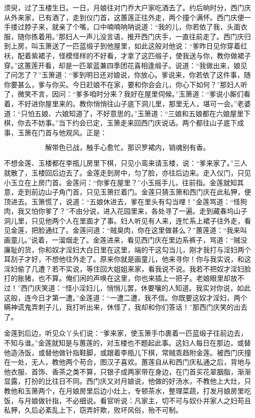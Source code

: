 须臾，过了玉楼生日。一日，月娘往对门乔大户家吃酒去了。约后晌时分，西门庆从外来家，已有酒了，走到仪门首，这蕙莲正往外走，两个撞个满怀。西门庆便一手搂过脖子来，就亲了个嘴，口中喃喃呐呐说道：“我的儿，你若依了我，头面衣服，随你拣着用。”那妇人一声儿没言语，推开西门庆手，一直往前走了。西门庆归到上房，叫玉箫送了一匹蓝缎子到他屋里，如此这般对他说：“爹昨日见你穿着红袄，配着紫裙子，怪模怪样的不好看，才拿了这匹缎子，使我送与你，教你做裙子穿。”这蕙莲开看，却是一匹翠蓝兼四季团花喜相逢缎子。说道：“我做出来，娘见了问怎了？”玉箫道：“爹到明日还对娘说，你放心。爹说来，你若依了这件事，随你要甚么，爹与你买。今日赶娘不在家，要和你会会儿，你心下如何？”那妇人听了，微笑不言，因问：“爹多咱时分来？我好在屋里伺候。”玉箫道：“爹说小厮们看着，不好进你屋里来的。教你悄悄往山子底下洞儿里，那里无人，堪可一会。”老婆道：“只怕五娘、六娘知道了，不好意思的。”玉箫道：“三娘和五娘都在六娘屋里下棋，你去不妨事。”当下约会已定，玉箫走来回西门庆说话。两个都往山子底下成事，玉箫在门首与他观风。正是：

\[
解带色已战，触手心愈忙。
那识罗裙内，销魂别有香。
\]

不想金莲、玉楼都在李瓶儿房里下棋，只见小鸾来请玉楼，说：“爹来家了。”三人就散了，玉楼回后边去了。金莲走到房中，匀了脸，亦往后边来。走入仪门，只见小玉立在上房门首。金莲问：“你爹在屋里？”小玉摇手儿，往前指。金莲就知其意，走到前边山子角门首，只见玉箫拦着门。金莲只猜玉箫和西门庆在此私狎，便顶进去。玉箫慌了，说道：“五娘休进去，爹在里头有勾当哩！”金莲骂道：“怪狗肉，我又怕你爹了？”不由分说，进入花园里来，各处寻了一遍。走到藏春坞山子洞儿里，只见他两个人在里面才了事。妇人听见有人来，连忙系上裙子往外走，看见金莲，把脸通红了。金莲问道：“贼臭肉，你在这里做甚么？”蕙莲道：“我来叫画童儿。”说着，一溜烟走了。金莲进来，看见西门庆在里边系裤子，骂道：“贼没廉耻的货，你和奴才淫妇大白日里在这里，端的干这勾当儿，刚才我打与淫妇两个耳刮子才好，不想他往外走了。原来你就是画童儿，他来寻你！你与我实说，和这淫妇偷了几遭？若不实说，等住回大姐姐来家，看我说不说。我若不把奴才淫妇脸打的胀猪，也不算。俺们闲的声唤在这里，你也来插上一把子。老娘眼里却放不过！”西门庆笑道：“怪小淫妇儿，悄悄儿罢，休要嚷的人知道。我实对你说，如此这般，连今日才第一遭。”金莲道：“一遭二遭，我不信。你既要这奴才淫妇，两个瞒神谎鬼弄刺子儿，我打听出来，休怪了，我却和你们答话！”那西门庆笑的出去了。

金莲到后边，听见众丫头们说：“爹来家，使玉箫手巾裹着一匹蓝缎子往前边去，不知与谁。”金莲就知是与蕙莲的，对玉楼也不题起此事。这妇人每日在那边，或替他造汤饭，或替他做针指鞋脚，或跟着李瓶儿下棋，常贼乖趋附金莲。被西门庆撞在一处，无人，教他两个苟合，图汉子喜欢。蕙莲自从和西门庆私通之后，背地与他衣服、首饰、香茶之类不算，只银子成两家带在身边，在门首买花翠胭脂，渐渐显露，打扮的比往日不同。西门庆又对月娘说，他做的好汤水，不教他上大灶，只教他和玉箫两个，在月娘房里后边小灶上，专顿茶水，整理菜蔬，打发月娘房里吃饭，与月娘做针指，不必细说。看官听说：凡家主，切不可与奴仆并家人之妇苟且私狎，久后必紊乱上下，窃弄奸欺，败坏风俗，殆不可制。

